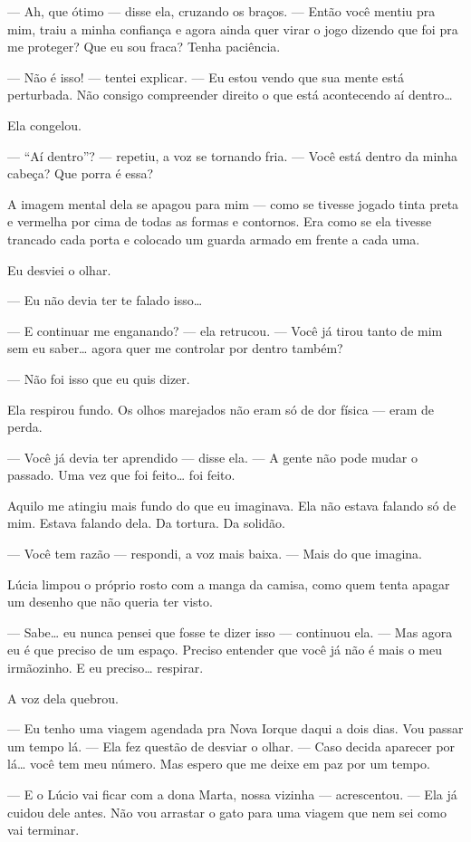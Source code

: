 — Ah, que ótimo — disse ela, cruzando os braços. — Então você mentiu pra mim, traiu a minha confiança e agora ainda quer virar o jogo dizendo que foi pra me proteger? Que eu sou fraca? Tenha paciência.

— Não é isso! — tentei explicar. — Eu estou vendo que sua mente está perturbada. Não consigo compreender direito o que está acontecendo aí dentro…

Ela congelou.

— “Aí dentro”? — repetiu, a voz se tornando fria. — Você está dentro da minha cabeça? Que porra é essa?

A imagem mental dela se apagou para mim — como se tivesse jogado tinta preta e vermelha por cima de todas as formas e contornos. Era como se ela tivesse trancado cada porta e colocado um guarda armado em frente a cada uma.

Eu desviei o olhar.

— Eu não devia ter te falado isso…

— E continuar me enganando? — ela retrucou. — Você já tirou tanto de mim sem eu saber… agora quer me controlar por dentro também?

— Não foi isso que eu quis dizer.

Ela respirou fundo. Os olhos marejados não eram só de dor física — eram de perda.

— Você já devia ter aprendido — disse ela. — A gente não pode mudar o passado. Uma vez que foi feito… foi feito.

Aquilo me atingiu mais fundo do que eu imaginava.  
Ela não estava falando só de mim.  
Estava falando dela.  
Da tortura.  
Da solidão.

— Você tem razão — respondi, a voz mais baixa. — Mais do que imagina.

Lúcia limpou o próprio rosto com a manga da camisa, como quem tenta apagar um desenho que não queria ter visto.

— Sabe… eu nunca pensei que fosse te dizer isso — continuou ela. — Mas agora eu é que preciso de um espaço. Preciso entender que você já não é mais o meu irmãozinho.  
E eu preciso… respirar.

A voz dela quebrou.

— Eu tenho uma viagem agendada pra Nova Iorque daqui a dois dias. Vou passar um tempo lá. — Ela fez questão de desviar o olhar. — Caso decida aparecer por lá… você tem meu número. Mas espero que me deixe em paz por um tempo.

— E o Lúcio vai ficar com a dona Marta, nossa vizinha — acrescentou. — Ela já cuidou dele antes. Não vou arrastar o gato para uma viagem que nem sei como vai terminar.

